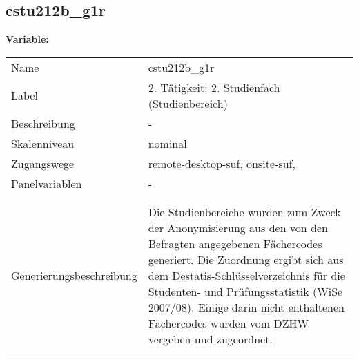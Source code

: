 	
	
	\subsection{cstu212b\_g1r}
	\label{subSection:cstu212b_g1r}

	\noindent\textbf{Variable:}\\
		\begin{tabular}{lL{11.3cm}}
			\label{tableVariable:cstu212b_g1r}
			Name & cstu212b\_g1r \\
			Label & 2. Tätigkeit: 2. Studienfach (Studienbereich) \\
			Beschreibung & - \\
			Skalenniveau & nominal \\
			Zugangswege &
				remote-desktop-suf,
				onsite-suf,
 \\
			Panelvariablen & -
			 \\
			 \\
 \\
					Generierungsbeschreibung & Die Studienbereiche wurden zum Zweck der Anonymisierung aus den von den Befragten angegebenen Fächercodes generiert. Die Zuordnung ergibt sich aus dem Destatis-Schlüsselverzeichnis für die Studenten- und Prüfungsstatistik (WiSe 2007/08). Einige darin nicht enthaltenen Fächercodes wurden vom DZHW vergeben und zugeordnet. 
				 \\	
			 \\
		\end{tabular}







